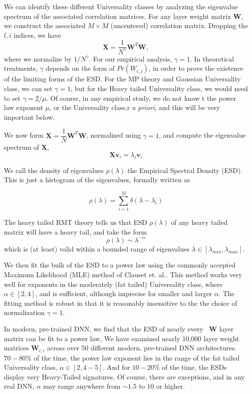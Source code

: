 We can identify these different Universality classes by analyzing the eigenvalue spectrum of the associated correlation matrices. 
For any layer weight matrix $\mathbf{W}$, we construct the associated $M\times M$ (uncentered) correlation matrix. 
Dropping the $l,i$ indices, we have
\begin{equation}
\mathbf{X} = \dfrac{1}{N^{\gamma}}\mathbf{W}^{T}\mathbf{W}  ,
\label{eqn:unc_corr_mat}
\end{equation}
where we normalize by $1/N^{\gamma}$. 
For our empirical analysis, $\gamma=1$. 
In theoretical treatments, $\gamma$ depends on the form of $Pr(W_{i,j})$, in order to prove the existence of the limiting forms of the ESD.
For the MP theory and Gaussian Universality class, we can set $\gamma=1$, but for the Heavy tailed Universality class, we would need to set $\gamma=2/\mu$.
Of course, in any empirical study, we do not know t the power law exponent $\mu$, or the Universality class,r \emph{a priori}, and this will be very important below. 

We now form $\mathbf{X}= \dfrac{1}{N}\mathbf{W}^{T}\mathbf{W}$, normalized using $\gamma=1$, and compute the eigenvalue spectrum of $\mathbf{X}$, 
$$
\mathbf{X}\mathbf{v}_{i}=\lambda_{i}\mathbf{v}_{i}
$$

We call the density of eigenvalues $\rho(\lambda)$ the Empirical Spectral Density (ESD).  This is just a histogram of the eigenvalues, formally written as

$$\rho(\lambda)=\sum\limits_{i=1}^{M}\delta(\lambda-\lambda_{i})$$

The heavy tailed RMT theory tells us that ESD  $\rho(\lambda)$ of any heavy tailed matrix will have a heavy tail, and take the form
$$
\rho(\lambda)\sim\lambda^{-\alpha}
$$
which is (at least) valid within a bounded range of eigenvalues $\lambda\in[\lambda_{min},\lambda_{max}]$.  

We then fit the bulk of the ESD to a power law using the commonly accepted Maximum Likelihood (MLE) method of Clauset et. al..
This method works very well for exponents in the moderately (fat tailed) Universality class, where $\alpha\in[2,4]$,
and is sufficient, although imprecise for smaller and larger $\alpha$.  The fitting method is robust in that it is  reasonably
insensitive to the the choice of normalization $\gamma=1$.


In modern, pre-trained DNN, we find that the ESD of nearly every \ $\mathbf{W}$ layer matrix can be fit to a power law,
We have examined nearly 10,000 layer weight matrices $\mathbf{W}_{l,i}$ across over 50 different modern. pre-trained DNN architectures.  
 $70-80\%$ of the time, the power law exponent lies in the range of the fat tailed Universality class, $\alpha\in[2,4-5]$.
And for $10-20\%$ of the time, the ESDs display very Heavy-Tailed signatures.
Of course, there are exceptions, and in any real DNN,  $\alpha$ may range anywhere from $\sim1.5$ to $10$ or higher.  

